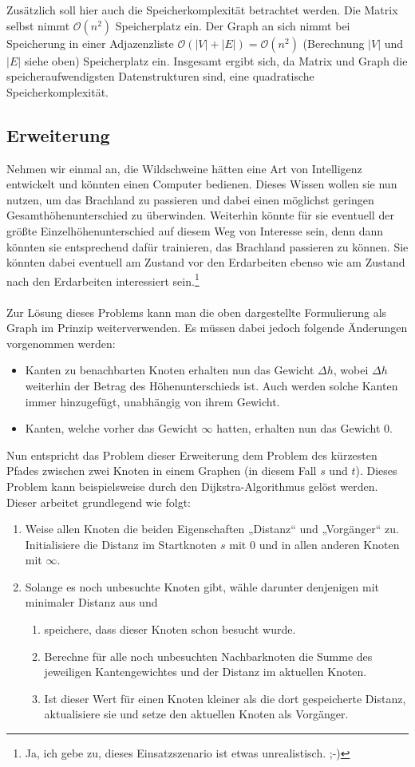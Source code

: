 \documentclass[a4paper, notitlepage, 12pt]{scrartcl}
\begin{document}
Zusätzlich soll hier auch die Speicherkomplexität betrachtet werden. Die Matrix selbst nimmt $\mathcal{O}(n^{2})$ Speicherplatz ein. Der Graph an sich nimmt bei Speicherung in einer Adjazenzliste $\mathcal{O}(|V| + |E|) = \mathcal{O}(n^{2})$ (Berechnung $|V|$ und $|E|$ siehe oben) Speicherplatz ein. Insgesamt ergibt sich, da Matrix und Graph die speicheraufwendigsten Datenstrukturen sind, eine quadratische Speicherkomplexität.
\subsection{Erweiterung}
Nehmen wir einmal an, die Wildschweine hätten eine Art von Intelligenz entwickelt und könnten einen Computer bedienen. Dieses Wissen wollen sie nun nutzen, um das Brachland zu passieren und dabei einen möglichst geringen Gesamthöhenunterschied zu überwinden. Weiterhin könnte für sie eventuell der größte Einzelhöhenunterschied auf diesem Weg von Interesse sein, denn dann könnten sie entsprechend dafür trainieren, das Brachland passieren zu können. Sie könnten dabei eventuell am Zustand vor den Erdarbeiten ebenso wie am Zustand nach den Erdarbeiten interessiert sein.\footnote{Ja, ich gebe zu, dieses Einsatzszenario ist etwas unrealistisch. ;-)}\\ \\
Zur Lösung dieses Problems kann man die oben dargestellte Formulierung als Graph im Prinzip weiterverwenden. Es müssen dabei jedoch folgende Änderungen vorgenommen werden:
\begin{itemize}
\item Kanten zu benachbarten Knoten erhalten nun das Gewicht $\Delta h$, wobei $\Delta h$ weiterhin der Betrag des Höhenunterschieds ist. Auch werden solche Kanten immer hinzugefügt, unabhängig von ihrem Gewicht.
\item Kanten, welche vorher das Gewicht $\infty$ hatten, erhalten nun das Gewicht $0$.
\end{itemize}
Nun entspricht das Problem dieser Erweiterung dem Problem des kürzesten Pfades zwischen zwei Knoten in einem Graphen (in diesem Fall $s$ und $t$). Dieses Problem kann beispielsweise durch den Dijkstra-Algorithmus gelöst werden. Dieser arbeitet grundlegend wie folgt:
\begin{enumerate}
\item Weise allen Knoten die beiden Eigenschaften „Distanz“ und „Vorgänger“ zu. Initialisiere die Distanz im Startknoten $s$ mit 0 und in allen anderen Knoten mit $\infty$.
\item Solange es noch unbesuchte Knoten gibt, wähle darunter denjenigen mit minimaler Distanz aus und
\begin{enumerate}
\item speichere, dass dieser Knoten schon besucht wurde.
\item Berechne für alle noch unbesuchten Nachbarknoten die Summe des jeweiligen Kantengewichtes und der Distanz im aktuellen Knoten.
\item Ist dieser Wert für einen Knoten kleiner als die dort gespeicherte Distanz, aktualisiere sie und setze den aktuellen Knoten als Vorgänger.
\end{enumerate}
\end{enumerate}
\end{document}
